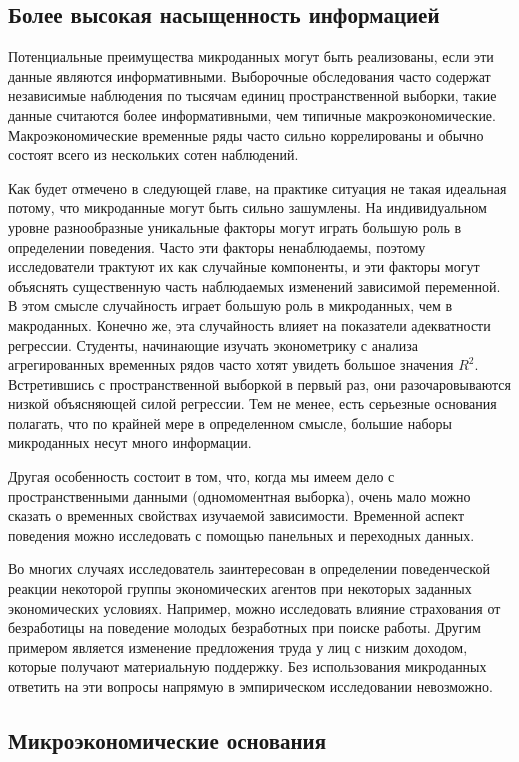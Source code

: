 \subsection{Более высокая насыщенность информацией}

Потенциальные преимущества микроданных могут быть реализованы, если эти данные являются информативными. Выборочные обследования часто содержат независимые наблюдения по тысячам единиц пространственной выборки, такие данные считаются  более информативными, чем типичные макроэкономические. Макроэкономические временные ряды часто сильно коррелированы и  обычно состоят всего из нескольких сотен наблюдений.
	
	
Как будет отмечено в следующей главе, на практике ситуация не такая идеальная потому, что микроданные могут быть сильно зашумлены. 
На индивидуальном уровне разнообразные уникальные факторы могут играть большую роль в определении поведения. Часто эти факторы ненаблюдаемы, поэтому исследователи трактуют их как случайные компоненты, и эти факторы могут объяснять существенную часть наблюдаемых изменений зависимой переменной. 
В этом смысле случайность играет большую роль в микроданных, чем в макроданных. Конечно же, эта случайность влияет на  показатели адекватности регрессии. Студенты, начинающие изучать эконометрику с анализа агрегированных временных рядов часто хотят увидеть большое значения $R^{2}$. Встретившись с пространственной выборкой в первый раз, они разочаровываются низкой объясняющей силой  регрессии. Тем не менее, есть серьезные основания полагать, что по крайней мере в определенном смысле, большие наборы микроданных несут много информации.
	
Другая особенность состоит в том, что, когда мы имеем дело с пространственными данными (одномоментная выборка), очень мало  можно сказать о временных свойствах изучаемой зависимости. Временной  аспект поведения можно исследовать с помощью панельных и переходных данных.
	
	
Во многих случаях исследователь заинтересован в определении поведенческой реакции некоторой группы экономических агентов при некоторых заданных экономических условиях. Например, можно исследовать влияние страхования от безработицы на поведение молодых безработных при поиске работы. Другим примером является изменение предложения труда у лиц с низким доходом, которые получают материальную поддержку. Без использования микроданных ответить на эти вопросы напрямую в эмпирическом исследовании невозможно.
	
\subsection{Микроэкономические основания}

